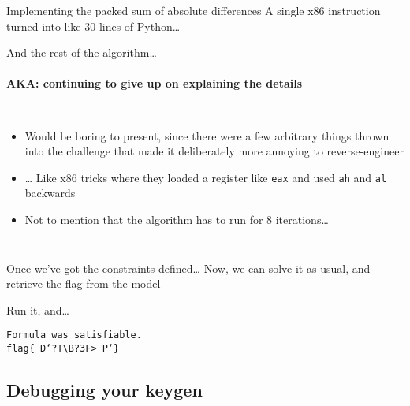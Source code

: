 \begin{frame}{Implementing the packed sum of absolute differences}
    A single x86 instruction turned into like 30 lines of Python\ldots \\
    \pause
\end{frame}

\begin{frame}{And the rest of the algorithm\ldots}
    \framesubtitle{AKA: continuing to give up on explaining the details}
    \begin{columns}

        \begin{itemize}
            \item Would be boring to present, since there were a few arbitrary
                  things thrown into the challenge that made it deliberately
                  more annoying to reverse-engineer
            \item \ldots\xspace Like x86 tricks where they loaded a register
                  like \texttt{eax} and used \texttt{ah} and \texttt{al}
                  backwards
            \item Not to mention that the algorithm has to run for 8
                  iterations\ldots
        \end{itemize}
    \end{columns}
\end{frame}

\begin{frame}{Once we've got the constraints defined\ldots}
    Now, we can solve it as usual, and retrieve the flag from the model \\
    \pause
\end{frame}

\begin{frame}{Run it, and\ldots}
    \begin{center}
        {\Large
            \texttt{Formula was satisfiable.} \\
            \texttt{flag\{ D`?T\textbackslash{}B?3F>~P`\}}
        }
    \end{center}
\end{frame}

\subsection{Debugging your keygen}

